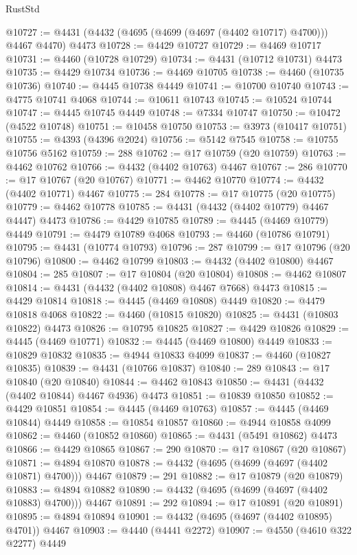 \begin{lexlean}{RustStd}
\begin{coremodule}
@10727 := @4431 (@4432 (@4695 (@4699 (@4697 (@4402 @10717) @4700))) @4467 @4470) @4473
@10728 := @4429 @10727
@10729 := @4469 @10717
@10731 := @4460 (@10728 @10729)
@10734 := @4431 (@10712 @10731) @4473
@10735 := @4429 @10734
@10736 := @4469 @10705
@10738 := @4460 (@10735 @10736)
@10740 := @4445 @10738 @4449
@10741 := @10700 @10740
@10743 := @4775 @10741 @4068
@10744 := @10611 @10743
@10745 := @10524 @10744
@10747 := @4445 @10745 @4449
@10748 := @7334 @10747
@10750 := @10472 (@4522 @10748)
@10751 := @10458 @10750
@10753 := @3973 (@10417 @10751)
@10755 := @4393 (@4396 @2024)
@10756 := @5142 @7545
@10758 := @10755 @10756 @5162
@10759 := 288
@10762 := @17 @10759 (@20 @10759)
@10763 := @4462 @10762
@10766 := @4432 (@4402 @10763) @4467
@10767 := 286
@10770 := @17 @10767 (@20 @10767)
@10771 := @4462 @10770
@10774 := @4432 (@4402 @10771) @4467
@10775 := 284
@10778 := @17 @10775 (@20 @10775)
@10779 := @4462 @10778
@10785 := @4431 (@4432 (@4402 @10779) @4467 @4447) @4473
@10786 := @4429 @10785
@10789 := @4445 (@4469 @10779) @4449
@10791 := @4479 @10789 @4068
@10793 := @4460 (@10786 @10791)
@10795 := @4431 (@10774 @10793)
@10796 := 287
@10799 := @17 @10796 (@20 @10796)
@10800 := @4462 @10799
@10803 := @4432 (@4402 @10800) @4467
@10804 := 285
@10807 := @17 @10804 (@20 @10804)
@10808 := @4462 @10807
@10814 := @4431 (@4432 (@4402 @10808) @4467 @7668) @4473
@10815 := @4429 @10814
@10818 := @4445 (@4469 @10808) @4449
@10820 := @4479 @10818 @4068
@10822 := @4460 (@10815 @10820)
@10825 := @4431 (@10803 @10822) @4473
@10826 := @10795 @10825
@10827 := @4429 @10826
@10829 := @4445 (@4469 @10771)
@10832 := @4445 (@4469 @10800) @4449
@10833 := @10829 @10832
@10835 := @4944 @10833 @4099
@10837 := @4460 (@10827 @10835)
@10839 := @4431 (@10766 @10837)
@10840 := 289
@10843 := @17 @10840 (@20 @10840)
@10844 := @4462 @10843
@10850 := @4431 (@4432 (@4402 @10844) @4467 @4936) @4473
@10851 := @10839 @10850
@10852 := @4429 @10851
@10854 := @4445 (@4469 @10763)
@10857 := @4445 (@4469 @10844) @4449
@10858 := @10854 @10857
@10860 := @4944 @10858 @4099
@10862 := @4460 (@10852 @10860)
@10865 := @4431 (@5491 @10862) @4473
@10866 := @4429 @10865
@10867 := 290
@10870 := @17 @10867 (@20 @10867)
@10871 := @4894 @10870
@10878 := @4432 (@4695 (@4699 (@4697 (@4402 @10871) @4700))) @4467
@10879 := 291
@10882 := @17 @10879 (@20 @10879)
@10883 := @4894 @10882
@10890 := @4432 (@4695 (@4699 (@4697 (@4402 @10883) @4700))) @4467
@10891 := 292
@10894 := @17 @10891 (@20 @10891)
@10895 := @4894 @10894
@10901 := @4432 (@4695 (@4697 (@4402 @10895) @4701)) @4467
@10903 := @4440 (@4441 @2272)
@10907 := @4550 (@4610 @322 @2277) @4449

\end{coremodule}
\end{lexlean}
